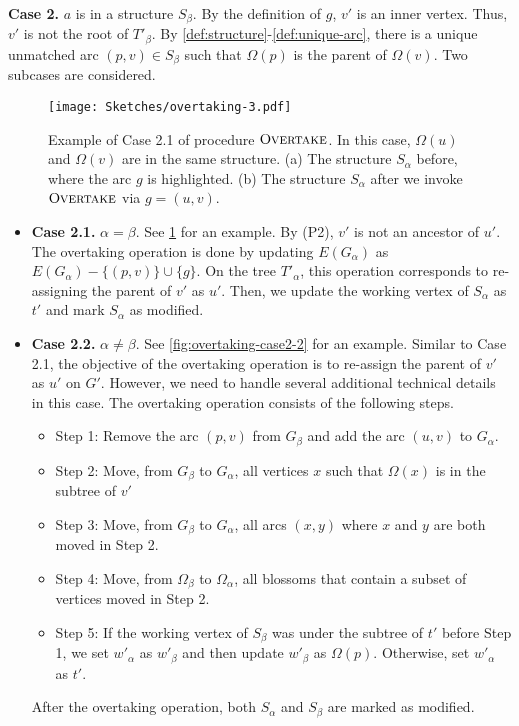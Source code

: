 \documentclass{article}
\newcommand{\alp}{\alpha}
\newcommand{\Omg}{\Omega}
\newcommand{\algOvertake}{\textsc{Overtake}\xspace}
\begin{document}
\vspace{3mm}
\noindent \textbf{Case 2.} $a$ is in a structure $S_\beta$.
By the definition of $g$, $v'$ is an inner vertex.
Thus, $v'$ is not the root of $T'_\beta$.
By \cref{def:structure}-\ref{def:unique-arc}, there is a unique unmatched arc $(p, v) \in S_\beta$ such that $\Omg(p)$ is the parent of $\Omg(v)$.
Two subcases are considered.
\begin{figure}
    \centering
    \texttt{[image: Sketches/overtaking-3.pdf]}
    \caption{Example of Case 2.1 of procedure $\algOvertake$. In this case, $\Omg(u)$ and $\Omg(v)$ are in the same structure. (a) The structure $S_\alp$ before, where the arc $g$ is highlighted. (b) The structure $S_\alp$ after we invoke $\algOvertake$ via $g = (u,v)$.}
    \label{fig:overtaking-case2-1}
\end{figure}


\begin{itemize}
    \item[] \textbf{Case 2.1.} $\alp = \beta$. See \cref{fig:overtaking-case2-1} for an example. By (P2), $v'$ is not an ancestor of $u'$.
    The overtaking operation is done by updating $E(G_\alp)$ as $E(G_\alp) - \{(p, v)\} \cup \{g\}$.
    On the tree $T'_\alp$, this operation corresponds to re-assigning the parent of $v'$ as $u'$.
    Then, we update the working vertex of $S_\alp$ as $t'$ and mark $S_\alp$ as modified.


\item[] \textbf{Case 2.2.} $\alp \neq \beta$.
    See \cref{fig:overtaking-case2-2} for an example.
    Similar to Case 2.1, the objective of the overtaking operation is to re-assign the parent of $v'$ as $u'$ on $G'$.
    However, we need to handle several additional technical details in this case.
    The overtaking operation consists of the following steps.
    \begin{itemize}
        \item[] Step 1: Remove the arc $(p, v)$ from $G_\beta$ and add the arc $(u, v)$ to $G_\alp$.
        \item[] Step 2: Move, from $G_\beta$ to $G_\alp$, all vertices $x$ such that $\Omg(x)$ is in the subtree of $v'$
        \item[] Step 3: Move, from $G_\beta$ to $G_\alp$, all arcs $(x, y)$ where $x$ and $y$ are both moved in Step 2.
        \item[] Step 4: Move, from $\Omg_\beta$ to $\Omg_\alp$, all blossoms that contain a subset of vertices moved in Step 2.
        \item[] Step 5: If the working vertex of $S_\beta$ was under the subtree of $t'$ before Step 1, we set $w'_\alp$ as $w'_\beta$ and then update $w'_\beta$ as $\Omg(p)$. Otherwise, set $w'_\alp$ as $t'$.
    \end{itemize}
    After the overtaking operation, both $S_\alp$ and $S_\beta$ are marked as modified.
\end{itemize}
\end{document}
